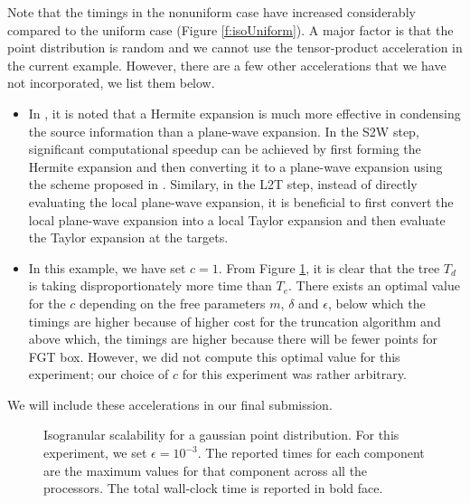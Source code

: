 Note that the timings in the nonuniform case have increased considerably compared to the uniform case (Figure \ref{f:isoUniform}). A 
major factor is that the point distribution is random and we cannot use the tensor-product acceleration in the current example. However,
 there are a few other accelerations that we have not incorporated, we list them below.
%
\begin{itemize}
  \item In \cite{fggt}, it is noted that a Hermite expansion is much more effective in condensing the source information than a plane-wave
   expansion. In the S2W step, significant computational speedup can be achieved by first forming the Hermite expansion and then converting 
   it to a plane-wave expansion using the scheme proposed in \cite{fggt}. Similary, in the L2T step, instead of directly evaluating the 
   local plane-wave expansion, it is beneficial to first convert the local plane-wave expansion into a local Taylor expansion and then evaluate 
   the Taylor expansion at the targets. 
  \item In this example, we have set $c = 1$. From Figure \ref{f:isoGaussian}, it is clear that the tree $T_d$ is taking disproportionately 
  more time than $T_e$. There exists an optimal value for the $c$ depending on the free parameters $m$, $\delta$ and $\epsilon$, below which
 the timings are higher because of higher cost for the truncation algorithm and above which, the timings are higher because
 there will be fewer points for FGT box. However, we did not compute this optimal value for this experiment; our choice of $c$ for this experiment
 was rather arbitrary.
\end{itemize}
%
We will include these accelerations in our final submission. 

\begin{figure}
	\begin{center}
	
	\end{center}
\caption{\label{f:isoGaussian} Isogranular scalability for a gaussian point distribution. For
 this experiment, we set $\epsilon = 10^{-3}$. The reported times for each component are the
 maximum values for that component across all the processors. The total wall-clock
time is reported in bold face.} 
\end{figure}
